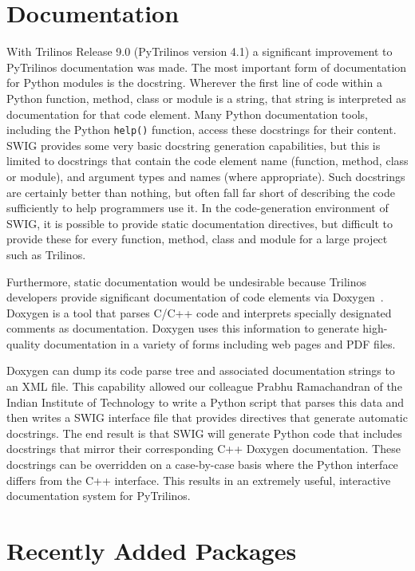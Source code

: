\documentclass[11pt]{article}
\begin{document}
\section{Documentation}
\label{sec:documentation}

With Trilinos Release 9.0 (PyTrilinos version 4.1) a significant improvement to PyTrilinos documentation was made.  The most important form of documentation for Python modules is the docstring.  Wherever the first line of code within a Python function, method, class or module is a string, that string is interpreted as documentation for that code element.  Many Python documentation tools, including the Python {\tt help()} function, access these docstrings for their content.  SWIG provides some very basic docstring generation capabilities, but this is limited to docstrings that contain the code element name (function, method, class or module), and argument types and names (where appropriate).  Such docstrings are certainly better than nothing, but often fall far short of describing the code sufficiently to help programmers use it.  In the code-generation environment of SWIG, it is possible to provide static documentation directives, but difficult to provide these for every function, method, class and module for a large project such as Trilinos.

Furthermore, static documentation would be undesirable because Trilinos developers provide significant documentation of code elements via Doxygen~\cite{Doxygen}.  Doxygen is a tool that parses C/C++ code and interprets specially designated comments as documentation.  Doxygen uses this information to generate high-quality documentation in a variety of forms including web pages and PDF files.

Doxygen can dump its code parse tree and associated documentation strings to an XML file.  This capability allowed our colleague Prabhu Ramachandran of the Indian Institute of Technology to write a Python script that parses this data and then writes a SWIG interface file that provides directives that generate automatic docstrings.  The end result is that SWIG will generate Python code that includes docstrings that mirror their corresponding C++ Doxygen documentation.  These docstrings can be overridden on a case-by-case basis where the Python interface differs from the C++ interface.  This results in an extremely useful, interactive documentation system for PyTrilinos.

\section{Recently Added Packages}
\label{sec:newpackages}
\end{document}
